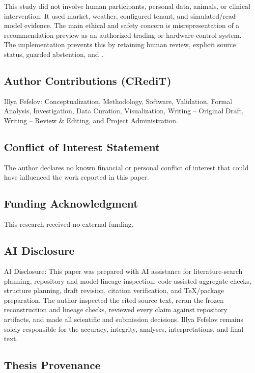 This study did not involve human participants, personal data, animals, or clinical intervention. It used market, weather, configured tenant, and simulated/read-model evidence. The main ethical and safety concern is misrepresentation of a recommendation preview as an authorized trading or hardware-control system. The implementation prevents this by retaining human review, explicit source status, guarded abstention, and .

\subsection{Author Contributions (CRediT)}

Illya Fefelov: Conceptualization, Methodology, Software, Validation, Formal Analysis, Investigation, Data Curation, Visualization, Writing -- Original Draft, Writing -- Review \& Editing, and Project Administration.

\subsection{Conflict of Interest Statement}

The author declares no known financial or personal conflict of interest that could have influenced the work reported in this paper.

\subsection{Funding Acknowledgment}

This research received no external funding.

\subsection{AI Disclosure}

AI Disclosure: This paper was prepared with AI assistance for literature-search planning, repository and model-lineage inspection, code-assisted aggregate checks, structure planning, draft revision, citation verification, and TeX/package preparation. The author inspected the cited source text, reran the frozen reconstruction and lineage checks, reviewed every claim against repository artifacts, and made all scientific and submission decisions. Illya Fefelov remains solely responsible for the accuracy, integrity, analyses, interpretations, and final text.

\subsection{Thesis Provenance}

